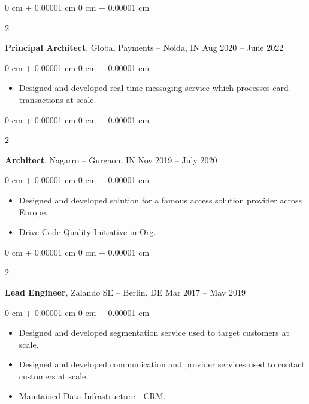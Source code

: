 \documentclass[10pt, letterpaper]{article}
\newenvironment{highlights}{
    \begin{itemize}[
        topsep=0.10 cm,
        parsep=0.10 cm,
        partopsep=0pt,
        itemsep=0pt,
        leftmargin=0 cm + 10pt
    ]
}{
    \end{itemize}
} %
\newenvironment{onecolentry}{
    \begin{adjustwidth}{
        0 cm + 0.00001 cm
    }{
        0 cm + 0.00001 cm
    }
}{
    \end{adjustwidth}
} %
\newenvironment{twocolentry}[2][]{
    \onecolentry
    \def\secondColumn{#2}
    \setcolumnwidth{\fill, 4.5 cm}
    \begin{paracol}{2}
}{
    \switchcolumn \raggedleft \secondColumn
    \end{paracol}
    \endonecolentry
} %
\begin{document}
        \begin{twocolentry}{
            Aug 2020 – June 2022
        }
            \textbf{Principal Architect}, Global Payments -- Noida, IN\end{twocolentry}

        \vspace{0.10 cm}
        
        \begin{onecolentry}
            \begin{highlights}
                \item Designed and developed real time messaging service which processes card transactions at scale.
            \end{highlights}
        \end{onecolentry}

        \vspace{0.2 cm}

        \begin{twocolentry}{
            Nov 2019 – July 2020
        }
            \textbf{Architect}, Nagarro -- Gurgaon, IN\end{twocolentry}

        \vspace{0.10 cm}
        
        \begin{onecolentry}
            \begin{highlights}
                \item Designed and developed solution for a famous access solution provider across Europe. 
                 \item Drive Code Quality Initiative in Org.
            \end{highlights}
        \end{onecolentry}


        \vspace{0.2 cm}

        \begin{twocolentry}{
            Mar 2017 – May 2019
        }
            \textbf{Lead Engineer}, Zalando SE -- Berlin, DE\end{twocolentry}

        \vspace{0.10 cm}
        
        \begin{onecolentry}
            \begin{highlights}
                \item Designed and developed segmentation service used to target customers at scale.
                \item Designed and developed communication and provider services used to contact customers at scale.
                \item Maintained Data Infrastructure - CRM.
            \end{highlights}
        \end{onecolentry}
\end{document}
